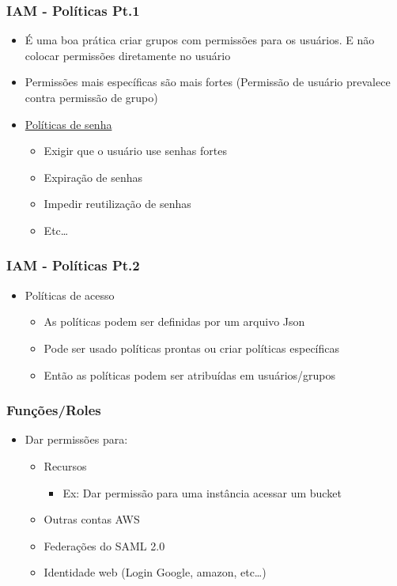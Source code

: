 \begin{frame}
	\frametitle{IAM - Políticas Pt.1}
	\begin{itemize}
		\item É uma boa prática criar grupos com permissões para os usuários. E não colocar permissões diretamente no usuário
		\item Permissões mais específicas são mais fortes (Permissão de usuário prevalece contra permissão de grupo)
		\item \href{https://docs.aws.amazon.com/pt_br/IAM/latest/UserGuide/id_credentials_passwords_account-policy.html}{Políticas de senha}
			\begin{itemize}
				\item Exigir que o usuário use senhas fortes
				\item Expiração de senhas
				\item Impedir reutilização de senhas
				\item Etc\dots
			\end{itemize}
	\end{itemize}
\end{frame}

\begin{frame}
	\frametitle{IAM - Políticas Pt.2}
	\begin{itemize}
		\item Políticas de acesso
			\begin{itemize}
				\item As políticas podem ser definidas por um arquivo Json
				\item Pode ser usado políticas prontas ou criar políticas específicas
				\item Então as políticas podem ser atribuídas em usuários/grupos
			\end{itemize}
	\end{itemize}
\end{frame}

\begin{frame}
	\frametitle{Funções/Roles}
	\begin{itemize}
		\item Dar permissões para:
			\begin{itemize}
				\item Recursos
				\begin{itemize}
					\item Ex: Dar permissão para uma instância acessar um bucket
				\end{itemize}
				\item Outras contas AWS
				\item Federações do SAML 2.0
				\item Identidade web (Login Google, amazon, etc\dots)
			\end{itemize}
	\end{itemize}
\end{frame}

